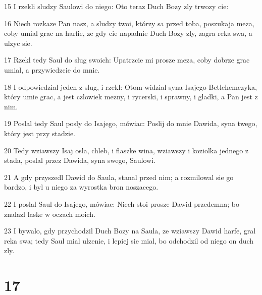 \par 15 I rzekli sludzy Saulowi do niego: Oto teraz Duch Bozy zly trwozy cie:
\par 16 Niech rozkaze Pan nasz, a sludzy twoi, którzy sa przed toba, poszukaja meza, coby umial grac na harfie, ze gdy cie napadnie Duch Bozy zly, zagra reka swa, a ulzyc sie.
\par 17 Rzekl tedy Saul do slug swoich: Upatrzcie mi prosze meza, coby dobrze grac umial, a przywiedzcie do mnie.
\par 18 I odpowiedzial jeden z slug, i rzekl: Otom widzial syna Isajego Betlehemczyka, który umie grac, a jest czlowiek mezny, i rycerski, i sprawny, i gladki, a Pan jest z nim.
\par 19 Poslal tedy Saul posly do Isajego, mówiac: Poslij do mnie Dawida, syna twego, który jest przy stadzie.
\par 20 Tedy wziawszy Isaj osla, chleb, i flaszke wina, wziawszy i koziolka jednego z stada, poslal przez Dawida, syna swego, Saulowi.
\par 21 A gdy przyszedl Dawid do Saula, stanal przed nim; a rozmilowal sie go bardzo, i byl u niego za wyrostka bron noszacego.
\par 22 I poslal Saul do Isajego, mówiac: Niech stoi prosze Dawid przedemna; bo znalazl laske w oczach moich.
\par 23 I bywalo, gdy przychodzil Duch Bozy na Saula, ze wziawszy Dawid harfe, gral reka swa; tedy Saul mial ulzenie, i lepiej sie mial, bo odchodzil od niego on duch zly.

\chapter{17}

